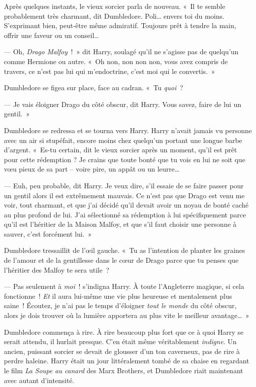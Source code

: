 Après quelques instants, le vieux sorcier parla de nouveau.
«~Il te semble probablement très charmant, dit Dumbledore.
Poli… envers toi du moins.
S'exprimant bien, peut-être même admiratif.
Toujours prêt à tendre la main, offrir une faveur ou un conseil…

--- Oh, \emph{Drago Malfoy}~!~»
dit Harry, soulagé qu'il ne s'agisse pas de quelqu'un comme Hermione ou autre.
«~Oh non, non non non, vous avez compris de travers, ce n'est pas lui qui m'endoctrine, c'est moi qui le convertis.~»

Dumbledore se figea sur place, face au cadran.
«~Tu \emph{quoi}~?

--- Je vais éloigner Drago du côté obscur, dit Harry.
Vous savez, faire de lui un gentil.~»

Dumbledore se redressa et se tourna vers Harry.
Harry n'avait jamais vu personne avec un air si stupéfait, encore moins chez quelqu'un portant une longue barbe d'argent.
«~Es-tu certain, dit le vieux sorcier après un moment, qu'il est prêt pour cette rédemption ?
Je crains que toute bonté que tu vois en lui ne soit que vœu pieux de sa part -- voire pire, un appât ou un leurre…

--- Euh, peu probable, dit Harry.
Je veux dire, s'il essaie de se faire passer pour un gentil alors il est extrêmement mauvais.
Ce n'est pas que Drago est venu me voir, tout charmant, et que j'ai décidé qu'il devait avoir un noyau de bonté caché au plus profond de lui.
J'ai sélectionné sa rédemption à lui spécifiquement parce qu'il est l'héritier de la Maison Malfoy, et que s'il faut choisir une personne à sauver, c'est forcément lui.~»

Dumbledore tressaillit de l'œil gauche.
«~Tu as l'intention de planter les graines de l'amour et de la gentillesse dans le cœur de Drago parce que tu penses que l'héritier des Malfoy te sera utile~?

--- Pas seulement à \emph{moi}~! s'indigna Harry.
À toute l'Angleterre magique, si cela fonctionne~!
\emph{Et} il aura lui-même une vie plus heureuse et mentalement plus saine~!
Écoutez, je n'ai pas le temps d'éloigner \emph{tout le monde} du côté obscur, alors je dois trouver où la lumière apportera au plus vite le meilleur avantage…~»

Dumbledore commença à rire.
À rire beaucoup plus fort que ce à quoi Harry se serait attendu, il hurlait presque.
C'en était même véritablement \emph{indigne}.
Un ancien, puissant sorcier se devait de glousser d'un ton caverneux, pas de rire à perdre haleine.
Harry était un jour littéralement tombé de sa chaise en regardant le film \emph{La Soupe au canard} des Marx Brothers, et Dumbledore riait maintenant avec autant d'intensité.

